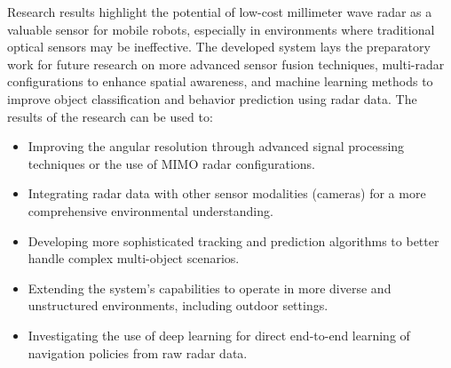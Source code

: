 Research results highlight the potential of low-cost millimeter wave radar as a valuable sensor for mobile robots, especially in environments where traditional optical sensors may be ineffective. The developed system lays the preparatory work for future research on more advanced sensor fusion techniques, multi-radar configurations to enhance spatial awareness, and machine learning methods to improve object classification and behavior prediction using radar data.
The results of the research can be used to:
\begin{itemize}
    \item Improving the angular resolution through advanced signal processing techniques or the use of MIMO radar configurations.
    \item Integrating radar data with other sensor modalities (cameras) for a more comprehensive environmental understanding.
    \item Developing more sophisticated tracking and prediction algorithms to better handle complex multi-object scenarios.
    \item Extending the system's capabilities to operate in more diverse and unstructured environments, including outdoor settings.
    \item Investigating the use of deep learning for direct end-to-end learning of navigation policies from raw radar data.
    
\end{itemize}

